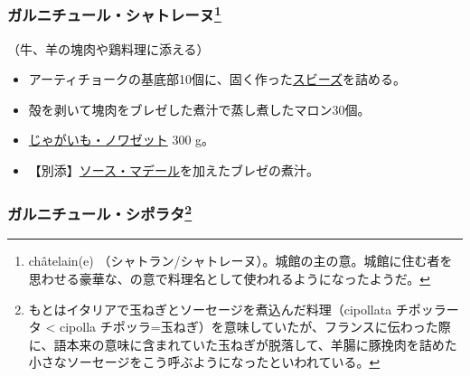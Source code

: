 \begin{recette}
\atoaki{}

\hypertarget{garniture-chatelaine}{%
\subsubsection[ガルニチュール・シャトレーヌ]{\texorpdfstring{ガルニチュール・シャトレーヌ\footnote{châtelain(e)
  （シャトラン/シャトレーヌ）。城館の主の意。城館に住む者を思わせる豪華な、の意で料理名として使われるようになったようだ。}}{ガルニチュール・シャトレーヌ}}\label{garniture-chatelaine}}



（牛、羊の塊肉や鶏料理に添える）

\begin{itemize}
\item
  アーティチョークの基底部10個に、固く作った\protect\hyperlink{sauce-soubise}{スビーズ}を詰める。
\item
  殻を剥いて塊肉をブレゼした煮汁で蒸し煮したマロン30個。
\item
  \protect\hyperlink{pommes-de-terre-noisette}{じゃがいも・ノワゼット}
  300 g。
\item
  【別添】\protect\hyperlink{sauce-madere}{ソース・マデール}を加えたブレゼの煮汁。
\end{itemize}

\atoaki{}

\hypertarget{garniture-chipolata}{%
\subsubsection[ガルニチュール・シポラタ]{\texorpdfstring{ガルニチュール・シポラタ\footnote{もとはイタリアで玉ねぎとソーセージを煮込んだ料理（cipollata
  チポッラータ \textless{} cipolla
  チポッラ=玉ねぎ）を意味していたが、フランスに伝わった際に、語本来の意味に含まれていた玉ねぎが脱落して、羊腸に豚挽肉を詰めた小さなソーセージをこう呼ぶようになったといわれている。}}{ガルニチュール・シポラタ}}\label{garniture-chipolata}}




\end{recette}
